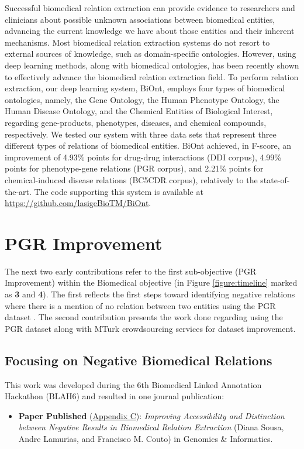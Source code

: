 Successful biomedical relation extraction can provide evidence to researchers and clinicians about possible unknown associations between biomedical entities, advancing the current knowledge we have about those entities and their inherent mechanisms. Most biomedical relation extraction systems do not resort to external sources of knowledge, such as domain-specific ontologies. However, using deep learning methods, along with biomedical ontologies, has been recently shown to effectively advance the biomedical relation extraction field. To perform relation extraction, our deep learning system, BiOnt, employs four types of biomedical ontologies, namely, the Gene Ontology, the Human Phenotype Ontology, the Human Disease Ontology, and the Chemical Entities of Biological Interest, regarding gene-products, phenotypes, diseases, and chemical compounds, respectively. We tested our system with three data sets that represent three different types of relations of biomedical entities. BiOnt achieved, in F-score, an improvement of 4.93\% points for drug-drug interactions (DDI corpus), 4.99\% points for phenotype-gene relations (PGR corpus), and 2.21\% points for chemical-induced disease relations (BC5CDR corpus), relatively to the state-of-the-art. The code supporting this system is available at \url{https://github.com/lasigeBioTM/BiOnt}. 


\section{PGR Improvement}

The next two early contributions refer to the first sub-objective (PGR Improvement) within the Biomedical objective (in Figure \ref{figure:timeline} marked as \textbf{3} and \textbf{4}). The first reflects the first steps toward identifying negative relations where there is a mention of no relation between two entities using the PGR dataset \citep{sousa2019silver}. The second contribution presents the work done regarding using the PGR dataset along with MTurk crowdsourcing services for dataset improvement. 

\subsection{Focusing on Negative Biomedical Relations}

This work was developed during the 6th Biomedical Linked Annotation Hackathon (BLAH6) and resulted in one journal publication:

\begin{itemize}
    \item{\textbf{Paper Published} \citep{sousa2020improving} (\hyperlink{AC}{Appendix C}): \textit{Improving Accessibility and Distinction between Negative Results in Biomedical Relation Extraction} (Diana Sousa, Andre Lamurias, and Francisco M. Couto) in Genomics \& Informatics.}
\end{itemize}

